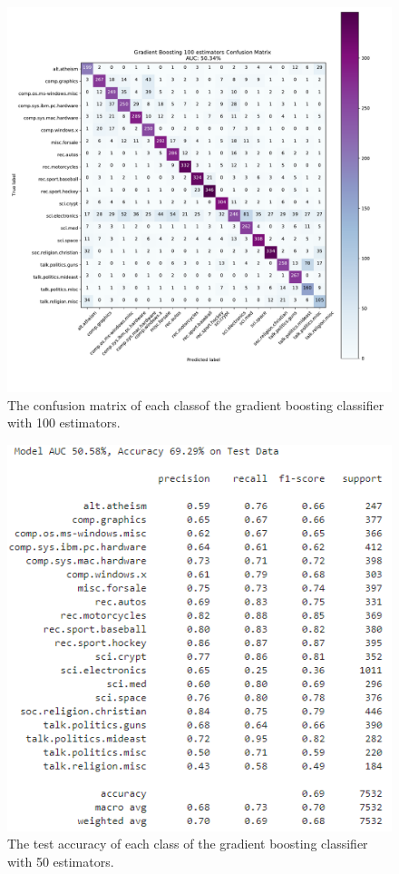 \documentclass[twocolumn]{extarticle}
\begin{document}
\begin{appendices}
\begin{figure}[H]
\centering
\includegraphics[width=0.9\linewidth]{"charts/Gradient Boosting 100 estimators"}
\caption{The confusion matrix of each classof the gradient boosting classifier with 100 estimators.}
\label{chart:gb-100-conf}
\end{figure}

\begin{figure}[H]
\centering
\includegraphics[width=0.9\linewidth]{charts/gb-50-acc}
\caption{The test accuracy of each class of the gradient boosting classifier with 50 estimators.}
\label{chart:gb-50-acc}
\end{figure}


\end{appendices}
\end{document}
